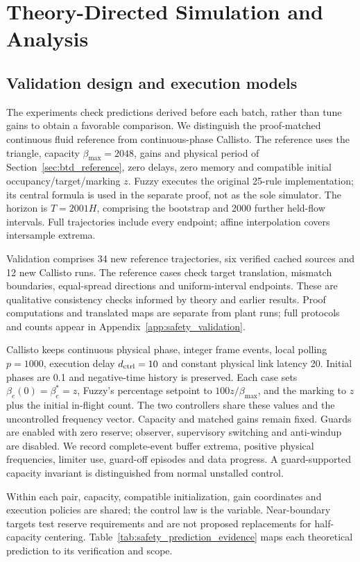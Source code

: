 \section{Theory-Directed Simulation and Analysis}
\label{sec:evaluation}

\subsection{Validation design and execution models}
The experiments check predictions derived before each batch, rather
than tune gains to obtain a favorable comparison. We distinguish
the proof-matched continuous fluid reference from continuous-phase
Callisto. The reference uses the triangle, capacity $\beta_{\max}=2048$, gains
and physical period of Section~\ref{sec:btd_reference}, zero delays,
zero memory and compatible initial occupancy/target/marking $z$.
Fuzzy executes the original 25-rule implementation; its central
formula is used in the separate proof, not as the sole simulator.
The horizon is $T=2001H$, comprising the bootstrap and 2000 further
held-flow intervals. Full trajectories include every endpoint;
affine interpolation covers intersample extrema.

Validation comprises 34 new reference trajectories, six verified
cached sources and 12 new Callisto runs. The reference cases check
target translation, mismatch boundaries, equal-spread directions
and uniform-interval endpoints. These are qualitative consistency
checks informed by theory and earlier results. Proof computations
and translated maps are separate from plant runs; full protocols
and counts appear in Appendix~\ref{app:safety_validation}.

Callisto keeps continuous physical phase, integer frame events,
local polling $p=1000$, execution delay $d_{\rm ctrl}=10$ and constant
physical link latency 20. Initial phases are 0.1 and negative-time
history is preserved. Each case sets $\beta_e(0)=\beta_e^*=z$,
Fuzzy's percentage setpoint to $100z/\beta_{\max}$, and the marking to $z$ plus
the initial in-flight count. The two controllers share these values
and the uncontrolled frequency vector. Capacity and matched gains
remain fixed. Guards are enabled with zero reserve; observer,
supervisory switching and anti-windup are disabled. We record
complete-event buffer extrema, positive physical frequencies,
limiter use, guard-off episodes and data progress. A guard-supported
capacity invariant is distinguished from normal unstalled control.

Within each pair, capacity, compatible initialization, gain coordinates
and execution policies are shared; the control law is the variable.
Near-boundary targets test reserve requirements and are not proposed
replacements for half-capacity centering. Table~\ref{tab:safety_prediction_evidence}
maps each theoretical prediction to its verification and scope.


